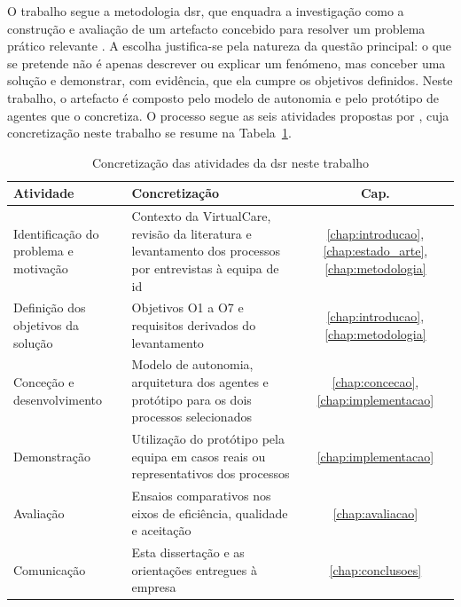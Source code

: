 O trabalho segue a metodologia \gls{dsr}, que enquadra a investigação como a construção e avaliação de um artefacto concebido para resolver um problema prático relevante \parencite{hevner2004design}. A escolha justifica-se pela natureza da questão principal: o que se pretende não é apenas descrever ou explicar um fenómeno, mas conceber uma solução e demonstrar, com evidência, que ela cumpre os objetivos definidos. Neste trabalho, o artefacto é composto pelo modelo de autonomia e pelo protótipo de agentes que o concretiza. O processo segue as seis atividades propostas por \textcite{peffers2007design}, cuja concretização neste trabalho se resume na Tabela~\ref{tab:dsr_atividades}.

\begin{table}[htbp]
  \centering
  \caption{Concretização das atividades da \gls{dsr} neste trabalho}
  \label{tab:dsr_atividades}
  \small
  \begin{tabularx}{\textwidth}{@{}>{\raggedright\arraybackslash}p{3.6cm} >{\raggedright\arraybackslash}X c@{}}
    \toprule
    \textbf{Atividade} & \textbf{Concretização} & \textbf{Cap.} \\
    \midrule
    Identificação do problema e motivação & Contexto da VirtualCare, revisão da literatura e levantamento dos processos por entrevistas à equipa de \gls{id} & \ref{chap:introducao}, \ref{chap:estado_arte}, \ref{chap:metodologia} \\
    \addlinespace
    Definição dos objetivos da solução & Objetivos O1 a O7 e requisitos derivados do levantamento & \ref{chap:introducao}, \ref{chap:metodologia} \\
    \addlinespace
    Conceção e desenvolvimento & Modelo de autonomia, arquitetura dos agentes e protótipo para os dois processos selecionados & \ref{chap:concecao}, \ref{chap:implementacao} \\
    \addlinespace
    Demonstração & Utilização do protótipo pela equipa em casos reais ou representativos dos processos & \ref{chap:implementacao} \\
    \addlinespace
    Avaliação & Ensaios comparativos nos eixos de eficiência, qualidade e aceitação & \ref{chap:avaliacao} \\
    \addlinespace
    Comunicação & Esta dissertação e as orientações entregues à empresa & \ref{chap:conclusoes} \\
    \bottomrule
  \end{tabularx}
\end{table}

